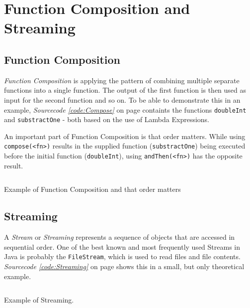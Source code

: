\documentclass[a4paper,12pt,twoside]{scrreprt}
\begin{document}
\clearpage

\section{Function Composition and Streaming}

\subsection{Function Composition}
\textit{Function Composition} is applying the pattern of combining multiple separate functions into a single function. The output of the first function is then used as input for the second function and so on. To be able to demonstrate this in an example, \textit{Sourcecode \ref{code:Compose}} on page \pageref{code:Compose} containts the functions \texttt{doubleInt} and \texttt{substractOne} - both based on the use of Lambda Expressions. 

An important part of Function Composition is that order matters. While using  \texttt{compose(<fn>)} results in the supplied function (\texttt{substractOne}) being executed before the initial function (\texttt{doubleInt}), using \texttt{andThen(<fn>)} has the opposite result.

\begin{listing}[ht]
    \inputminted[fontsize=\footnotesize,linenos,breaklines,breakanywhere]{java}{./code/FunctionComposition.java}
    \caption[Example of Function Composition and that order matters]{Example of Function Composition and that order matters}
    \label{code:Compose}
\end{listing}

\clearpage

\subsection{Streaming}
A \textit{Stream} or \textit{Streaming} represents a sequence of objects that are accessed in sequential order. One of the best known and most frequently used Streams in Java is probably the \texttt{FileStream}, which is used to read files and file contents. \textit{Sourcecode \ref{code:Streaming}} on page \pageref{code:Streaming} shows this in a small, but only theoretical example.

\begin{listing}[ht]
    \inputminted[fontsize=\footnotesize,linenos,breaklines]{java}{./code/Streaming.java}
    \caption[Example of Streaming]{Example of Streaming.}
    \label{code:Streaming}
\end{listing}
\end{document}
